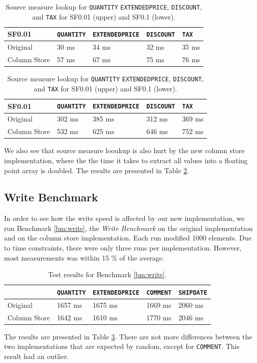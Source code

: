 \begin{table}
    \centering
    \begin{tabularx}{\textwidth}{X | X X X X}
        SF0.01 & \texttt{QUANTITY} & \texttt{EXTENDEDPRICE} & \texttt{DISCOUNT} & \texttt{TAX}\\ 
        \hline
        \hline
        Original & 30 ms & 34 ms & 32 ms & 35 ms \\
        Column Store & 57 ms & 67 ms & 75 ms & 76 ms
    \end{tabularx}
    \newline
    \vspace*{1 cm}
    \newline
    \begin{tabularx}{\textwidth}{X | X X X X}
        SF0.01 & \texttt{QUANTITY} & \texttt{EXTENDEDPRICE} & \texttt{DISCOUNT} & \texttt{TAX}\\ 
        \hline
        \hline
        Original & 302 ms & 385 ms & 312 ms & 369 ms \\
        Column Store & 532 ms & 625 ms & 646 ms & 752 ms
    \end{tabularx}
    \caption{Source measure lookup for \texttt{QUANTITY} \texttt{EXTENDEDPRICE}, \texttt{DISCOUNT}, and \texttt{TAX} for SF0.01 (upper) and SF0.1 (lower).} 
    \label{tab:non-blackbox-sml}
\end{table}
We also see that source measure looukup is also hurt by the new column store implementation, where the the time it takes to extract all values into a floating point array is doubled. The results are presented in Table \ref{tab:non-blackbox-sml}.

\subsection{Write Benchmark}
\label{sub:Write Benchmark}
In order to see how the write speed is affected by our new implementation, we run Benchmark \ref{bm:write}, the \textit{Write Benchmark} on the original implementation and on the column store implementation. Each run modified 1000 elements. Due to time constraints, there were only three runs per implementation. However, most measurements was within 15 \% of the average.

\begin{table}
    \begin{tabularx}{\textwidth}{X | X X X X}
         & \texttt{QUANTITY} & \texttt{EXTENDEDPRICE} & \texttt{COMMENT} & \texttt{SHIPDATE}\\ 
        \hline
        \hline
        Original & 1657 ms & 1675 ms & 1669 ms & 2060 ms \\
        Column Store & 1642 ms & 1610 ms & 1770 ms & 2046 ms
    \end{tabularx}
    \caption{Test results for Benchmark \ref{bm:write}.}
    \label{tab:non-blackbox-write}
\end{table}
The results are presented in Table \ref{tab:non-blackbox-write}. There are not more differences between the two implementations that are expected by random, except for \texttt{COMMENT}. This result had an outlier.

